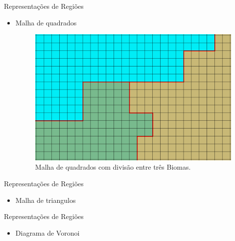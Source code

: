 \begin{frame}{Representações de Regiões}
    \begin{itemize} \setlength\itemsep{1em}
        \item Malha de quadrados
        \begin{figure}[H]
            \centering
            \includegraphics[width=.5\textwidth, height=.5\textheight]{img/squadStripBiomes}
            \caption{Malha de quadrados com divisão entre três Biomas.}
            \label{fig:squadStripBiomes}
        \end{figure}
    \end{itemize}
\end{frame}

\begin{frame}{Representações de Regiões}
    \begin{itemize} \setlength\itemsep{1em}
        \item Malha de triangulos
        
    \end{itemize}
\end{frame}

\begin{frame}{Representações de Regiões}
    \begin{itemize} \setlength\itemsep{1em}
        \item Diagrama de Voronoi
        
    \end{itemize}
\end{frame}